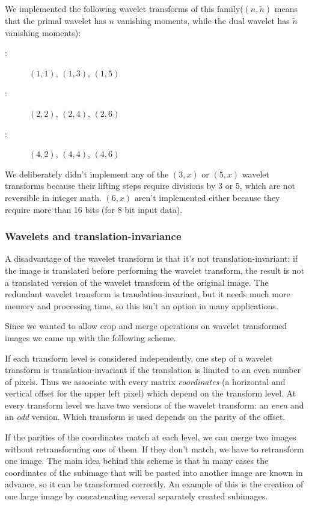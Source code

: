 We implemented the following wavelet transforms of this family($(n, \tilde{n})$
means that the primal wavelet has $n$ vanishing moments, while the dual wavelet
has $\tilde{n}$ vanishing moments):
\begin{description}
\item[:] $(1, 1)$, $(1, 3)$, $(1, 5)$
\item[:] $(2, 2)$, $(2, 4)$, $(2, 6)$
\item[:] $(4, 2)$, $(4, 4)$, $(4, 6)$
\end{description}
We deliberately didn't implement any of the $(3, x)$ or $(5, x)$ wavelet
transforms because their lifting steps require divisions by 3 or 5, which are
not reversible in integer math. $(6, x)$ aren't implemented either because they
require more than 16 bits (for 8 bit input data).


\subsubsection{Wavelets and translation-invariance}

A disadvantage of the wavelet transform is that it's not translation-invariant:
if the image is translated before performing the wavelet transform, the result
is not a translated version of the wavelet transform of the original image.
The redundant wavelet transform is translation-invariant, but it needs much
more memory and processing time, so this isn't an option in many applications.

Since we wanted to allow crop and merge operations on wavelet transformed
images we came up with the following scheme.

If each transform level is considered independently, one step of a wavelet
transform is translation-invariant if the translation is limited to an even
number of pixels. Thus we associate with every matrix \emph{coordinates} (a
horizontal and vertical offset for the upper left pixel) which
depend on the transform level. At every transform level we have two versions of
the wavelet transform: an \emph{even} and an \emph{odd} version. Which
transform is used depends on the parity of the offset.

If the parities of the coordinates match at each level, we can merge two
images without retransforming one of them. If they don't match, we have to
retransform one image. The main idea behind this scheme is that in many cases
the coordinates of the subimage that will be pasted into another image are
known in advance, so it can be transformed correctly. An example of this is the
creation of one large image by concatenating several separately created
subimages.


